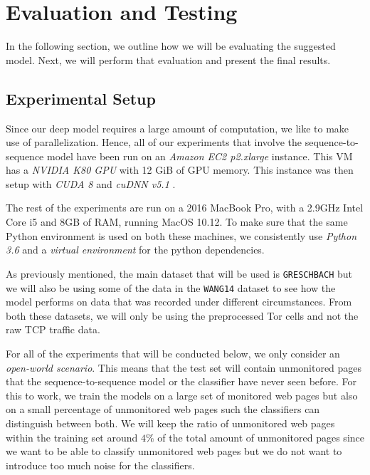 

\chapter{Evaluation and Testing}

In the following section, we outline how we will be evaluating the suggested model.
Next, we will perform that evaluation and present the final results.

\section{Experimental Setup}

Since our deep model requires a large amount of computation, we like to make use of parallelization.
Hence, all of our experiments that involve the sequence-to-sequence model have been run on an \textit{Amazon EC2 p2.xlarge} instance.
This VM has a \textit{NVIDIA K80 GPU} with 12 GiB of GPU memory.
This instance was then setup with \textit{CUDA 8} and \textit{cuDNN v5.1} \cite{tensorflow,nvidia_developer_2017}.

The rest of the experiments are run on a 2016 MacBook Pro, with a 2.9GHz Intel Core i5 and 8GB of RAM, running MacOS 10.12.
To make sure that the same Python environment is used on both these machines, we consistently use \textit{Python 3.6} and a \textit{virtual environment} for the python dependencies.

As previously mentioned, the main dataset that will be used is \texttt{GRESCHBACH} but we will also be using some of the data in the \texttt{WANG14} dataset to see how the model performs on data that was recorded under different circumstances.
From both these datasets, we will only be using the preprocessed Tor cells and not the raw TCP traffic data.

For all of the experiments that will be conducted below, we only consider an \textit{open-world scenario}.
This means that the test set will contain unmonitored pages that the sequence-to-sequence model or the classifier have never seen before.
For this to work, we train the models on a large set of monitored web pages but also on a small percentage of unmonitored web pages such the classifiers can distinguish between both.
We will keep the ratio of unmonitored web pages within the training set around $4\%$ of the total amount of unmonitored pages since we want to be able to classify unmonitored web pages but we do not want to introduce too much noise for the classifiers.

